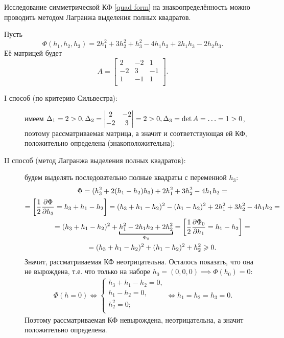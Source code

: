 \documentclass[../../main.tex]{subfiles}
\begin{document}
	Исследование симметрической КФ \eqref{quad form} на знакоопределённость
	можно проводить методом Лагранжа выделения полных квадратов.
	
	\begin{exmp}
		Пусть
		\[
			\Phi(h_1, h_2, h_3)
			= 2 h_1^2 + 3 h_2^2 + h_3^2 - 4 h_1 h_2 + 2 h_1 h_3 - 2 h_2 h_3.
		\]
		Её матрицей будет
		\[
			A =
			\begin{bmatrix}
				2 & -2 & 1 \\
				-2 & 3 & -1 \\
				1 & -1 & 1 \\
			\end{bmatrix}.
		\]
		\begin{description}
			\item[I способ (по критерию Сильвестра):]
			имеем $\Delta_1 = 2 > 0, \Delta_2 =
			\begin{vmatrix}
				2 & -2 \\
				-2 & 3 \\
			\end{vmatrix}
			= 2 > 0, \\
			\Delta_3 = \det A = \ldots = 1 > 0$,
			поэтому рассматриваемая матрица, а значит и соответствующая ей КФ,
			положительно определена (знакоположительна);
			
			\item[II способ (метод Лагранжа выделения полных квадратов):]
			будем выделять последовательно полные квадраты с переменной $h_3$:
			\begin{gather*}
				\Phi
				= (h_3^2 + 2(h_1 - h_2) h_3) + 2 h_1^2 + 3 h_2^2 - 4 h_1 h_2
				= \\ = \left[\dfrac{1}{2} \pderiv{\Phi}{h_3}
				= h_3 + h_1 - h_2\right]
				= (h_3 + h_1 - h_2)^2 - (h_1 - h_2)^2 + 2 h_1^2 + 3 h_2^2
				- 4 h_1 h_2
				= \\ = (h_3 + h_1 - h_2)^2 + \underbracket{h_1^2 - 2 h_1 h_2
				+ 2 h_2^2}_{\Phi_0}
				= \left[\dfrac{1}{2} \pderiv{\Phi_0}{h_1}
				= h_1 - h_2\right]
				= \\ = (h_3 + h_1 - h_2)^2 + (h_1 - h_2)^2 + h_2^2 \ge 0.
			\end{gather*}
			Значит, рассматриваемая КФ неотрицательна.
			Осталось показать, что она не вырождена,
			т.е. что только на наборе $h_0 = (0, 0, 0) \implies
			\Phi(h_0) = 0$:
			\begin{gather*}
				\Phi(h = 0)
				\iff
				\begin{cases}
					h_3 + h_1 - h_2 = 0, \\
					h_1 - h_2 = 0, \\
					h_2^2 = 0; \\
				\end{cases}
				\iff
				h_1 = h_2 = h_3 = 0.
			\end{gather*}
			Поэтому рассматриваемая КФ невырождена, неотрицательна,
			а значит положительно определена.
		\end{description}
	\end{exmp}
	
\end{document}
